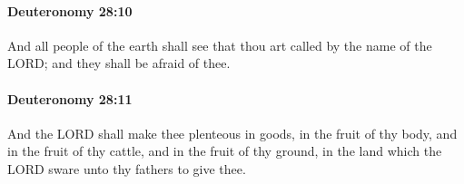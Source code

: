 		\paragraph{Deuteronomy 28:10} %
			\label{DEUTERONOMY-28-10}

			And all people of the earth shall see that thou art called by the name of the LORD; and they shall be afraid of thee.


		\paragraph{Deuteronomy 28:11} %
			\label{DEUTERONOMY-28-11}

			And the LORD shall make thee plenteous in goods, in the fruit of thy body, and in the fruit of thy cattle, and in the fruit of thy ground, in the land which the LORD sware unto thy fathers to give thee.


